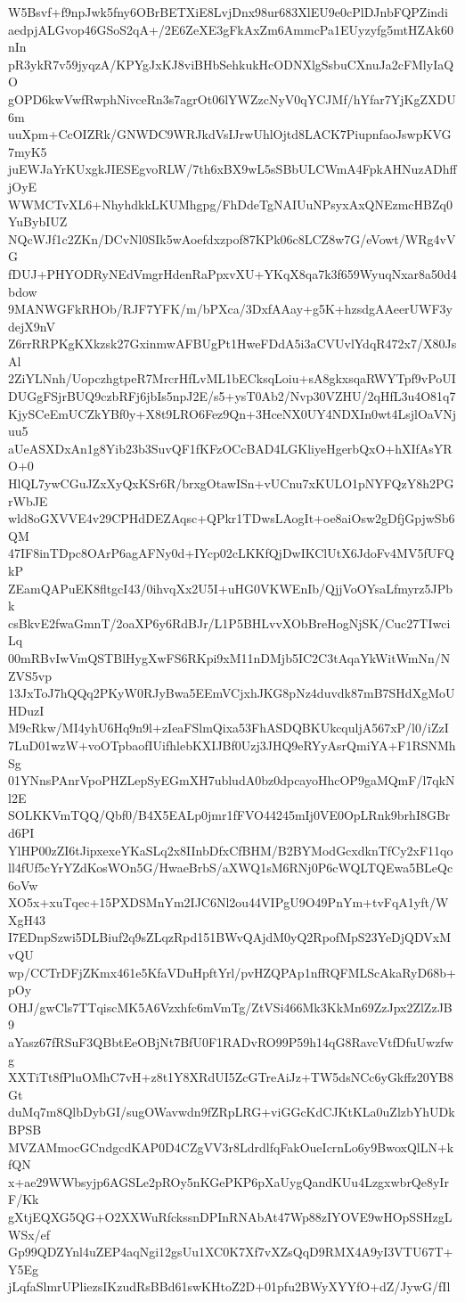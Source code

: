 W5Bsvf+f9npJwk5fny6OBrBETXiE8LvjDnx98ur683XlEU9e0cPlDJnbFQPZindi
aedpjALGvop46GSoS2qA+/2E6ZeXE3gFkAxZm6AmmcPa1EUyzyfg5mtHZAk60nIn
pR3ykR7v59jyqzA/KPYgJxKJ8viBHbSehkukHcODNXlgSsbuCXnuJa2cFMlyIaQO
gOPD6kwVwfRwphNivceRn3s7agrOt06lYWZzcNyV0qYCJMf/hYfar7YjKgZXDU6m
uuXpm+CcOIZRk/GNWDC9WRJkdVsIJrwUhlOjtd8LACK7PiupnfaoJswpKVG7myK5
juEWJaYrKUxgkJIESEgvoRLW/7th6xBX9wL5sSBbULCWmA4FpkAHNuzADhffjOyE
WWMCTvXL6+NhyhdkkLKUMhgpg/FhDdeTgNAIUuNPsyxAxQNEzmcHBZq0YuBybIUZ
NQcWJf1c2ZKn/DCvNl0SIk5wAoefdxzpof87KPk06c8LCZ8w7G/eVowt/WRg4vVG
fDUJ+PHYODRyNEdVmgrHdenRaPpxvXU+YKqX8qa7k3f659WyuqNxar8a50d4bdow
9MANWGFkRHOb/RJF7YFK/m/bPXca/3DxfAAay+g5K+hzsdgAAeerUWF3ydejX9nV
Z6rrRRPKgKXkzsk27GxinmwAFBUgPt1HweFDdA5i3aCVUvlYdqR472x7/X80JsAl
2ZiYLNnh/UopczhgtpeR7MrcrHfLvML1bECksqLoiu+sA8gkxsqaRWYTpf9vPoUI
DUGgFSjrBUQ9czbRFj6jbIs5npJ2E/s5+ysT0Ab2/Nvp30VZHU/2qHfL3u4O81q7
KjySCeEmUCZkYBf0y+X8t9LRO6Fez9Qn+3HceNX0UY4NDXIn0wt4LsjlOaVNjuu5
aUeASXDxAn1g8Yib23b3SuvQF1fKFzOCcBAD4LGKliyeHgerbQxO+hXIfAsYRO+0
HlQL7ywCGuJZxXyQxKSr6R/brxgOtawISn+vUCnu7xKULO1pNYFQzY8h2PGrWbJE
wld8oGXVVE4v29CPHdDEZAqsc+QPkr1TDwsLAogIt+oe8aiOsw2gDfjGpjwSb6QM
47IF8inTDpc8OArP6agAFNy0d+IYcp02cLKKfQjDwIKClUtX6JdoFv4MV5fUFQkP
ZEamQAPuEK8fltgcI43/0ihvqXx2U5I+uHG0VKWEnIb/QjjVoOYsaLfmyrz5JPbk
csBkvE2fwaGmnT/2oaXP6y6RdBJr/L1P5BHLvvXObBreHogNjSK/Cuc27TIwciLq
00mRBvIwVmQSTBlHygXwFS6RKpi9xM11nDMjb5IC2C3tAqaYkWitWmNn/NZVS5vp
13JxToJ7hQQq2PKyW0RJyBwa5EEmVCjxhJKG8pNz4duvdk87mB7SHdXgMoUHDuzI
M9cRkw/MI4yhU6Hq9n9l+zIeaFSlmQixa53FhASDQBKUkcquljA567xP/l0/iZzI
7LuD01wzW+voOTpbaofIUifhlebKXIJBf0Uzj3JHQ9eRYyAsrQmiYA+F1RSNMhSg
01YNnsPAnrVpoPHZLepSyEGmXH7ubludA0bz0dpcayoHhcOP9gaMQmF/l7qkNl2E
SOLKKVmTQQ/Qbf0/B4X5EALp0jmr1fFVO44245mIj0VE0OpLRnk9brhI8GBrd6PI
YlHP00zZI6tJipxexeYKaSLq2x8IInbDfxCfBHM/B2BYModGcxdknTfCy2xF11qo
ll4fUf5cYrYZdKosWOn5G/HwaeBrbS/aXWQ1sM6RNj0P6cWQLTQEwa5BLeQc6oVw
XO5x+xuTqec+15PXDSMnYm2IJC6Nl2ou44VIPgU9O49PnYm+tvFqA1yft/WXgH43
I7EDnpSzwi5DLBiuf2q9sZLqzRpd151BWvQAjdM0yQ2RpofMpS23YeDjQDVxMvQU
wp/CCTrDFjZKmx461e5KfaVDuHpftYrl/pvHZQPAp1nfRQFMLScAkaRyD68b+pOy
OHJ/gwCls7TTqiscMK5A6Vzxhfc6mVmTg/ZtVSi466Mk3KkMn69ZzJpx2ZlZzJB9
aYasz67fRSuF3QBbtEeOBjNt7BfU0F1RADvRO99P59h14qG8RavcVtfDfuUwzfwg
XXTiTt8fPluOMhC7vH+z8t1Y8XRdUI5ZcGTreAiJz+TW5dsNCc6yGkffz20YB8Gt
duMq7m8QlbDybGI/sugOWavwdn9fZRpLRG+viGGcKdCJKtKLa0uZlzbYhUDkBPSB
MVZAMmocGCndgcdKAP0D4CZgVV3r8LdrdlfqFakOueIcrnLo6y9BwoxQlLN+kfQN
x+ae29WWbsyjp6AGSLe2pROy5nKGePKP6pXaUygQandKUu4LzgxwbrQe8yIrF/Kk
gXtjEQXG5QG+O2XXWuRfckssnDPInRNAbAt47Wp88zIYOVE9wHOpSSHzgLWSx/ef
Gp99QDZYnl4uZEP4aqNgi12gsUu1XC0K7Xf7vXZsQqD9RMX4A9yI3VTU67T+Y5Eg
jLqfaSlmrUPliezsIKzudRsBBd61swKHtoZ2D+01pfu2BWyXYYfO+dZ/JywG/fIl
